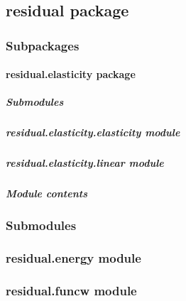 \documentclass[letterpaper,10pt,english]{sphinxmanual}
\begin{document}
\subsection{residual package}
\label{\detokenize{residual:residual-package}}\label{\detokenize{residual::doc}}

\subsubsection{Subpackages}
\label{\detokenize{residual:subpackages}}

\paragraph{residual.elasticity package}
\label{\detokenize{residual.elasticity:residual-elasticity-package}}\label{\detokenize{residual.elasticity::doc}}

\subparagraph{Submodules}
\label{\detokenize{residual.elasticity:submodules}}

\subparagraph{residual.elasticity.elasticity module}
\label{\detokenize{residual.elasticity:residual-elasticity-elasticity-module}}

\subparagraph{residual.elasticity.linear module}
\label{\detokenize{residual.elasticity:residual-elasticity-linear-module}}

\subparagraph{Module contents}
\label{\detokenize{residual.elasticity:module-residual.elasticity}}\label{\detokenize{residual.elasticity:module-contents}}

\subsubsection{Submodules}
\label{\detokenize{residual:submodules}}

\subsubsection{residual.energy module}
\label{\detokenize{residual:residual-energy-module}}

\subsubsection{residual.funcw module}
\label{\detokenize{residual:residual-funcw-module}}
\end{document}
